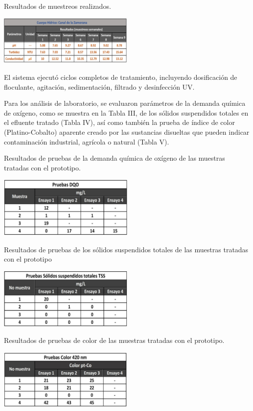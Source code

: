 \documentclass[conference]{IEEEtran}
\begin{document}
\begin{table}[h]
	\centering
	\caption{Resultados de muestreos realizados.}
	\includegraphics[width=0.5\textwidth]{tabla2.jpg}
	\label{tab:tabla02}
\end{table}

El sistema ejecutó ciclos completos de tratamiento, incluyendo dosificación de floculante, agitación, sedimentación, filtrado y desinfección UV.

Para los análisis de laboratorio, se evaluaron parámetros de la demanda química de oxígeno, como se muestra en la Tabla III, de los sólidos suspendidos totales en el efluente tratado (Tabla IV), así como también la prueba de índice de color (Platino-Cobalto) aparente creado por las sustancias disueltas que pueden indicar contaminación industrial, agrícola o natural (Tabla V).

\begin{table}[h]
	\centering
	\caption{Resultados de pruebas de la demanda química de oxígeno de las muestras tratadas con el prototipo.}
	\includegraphics[width=0.5\textwidth]{tabla3.jpg}

\end{table}
		
\begin{table}[h]
	\centering
	\caption{Resultados de pruebas de los sólidos suspendidos totales de las muestras tratadas con el prototipo}
	\includegraphics[width=0.5\textwidth]{tabla4.jpg}

\end{table}		
		
\begin{table}[h]
	\centering
	\caption{Resultados de pruebas de color de las muestras tratadas con el prototipo.}
	\includegraphics[width=0.5\textwidth]{tabla5.jpg}

\end{table}
		
\end{document}
